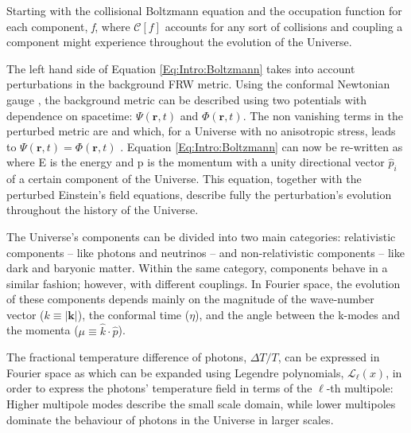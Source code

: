 \qquad Starting with the collisional Boltzmann equation and the occupation function for each component, \textit{f}, 
where $\mathcal{C}[f]$ accounts for any sort of collisions and coupling a component might experience throughout the evolution of the Universe.

\qquad The left hand side of Equation \eqref{Eq:Intro:Boltzmann} takes into account perturbations in the background FRW metric. Using the conformal Newtonian gauge \citep{dods}, the background metric can be described using two potentials with dependence on spacetime: $\Psi (\textbf{r}, t)$ and $\Phi (\textbf{r}, t)$. The non vanishing terms in the perturbed metric are
and 
which, for a Universe with no anisotropic stress, leads to $\Psi (\textbf{r},t) = \Phi(\textbf{r},t)$ \citep{Peacock}. Equation \eqref{Eq:Intro:Boltzmann} can now be re-written as
where E is the energy and p is the momentum with a unity directional vector $\hat{p}_i$ of a certain component of the Universe. This equation, together with the perturbed Einstein's field equations, describe fully the perturbation's evolution throughout the history of the Universe.

\qquad The Universe's components can be divided into two main categories: relativistic components -- like photons and neutrinos -- and non-relativistic components -- like dark and baryonic matter. Within the same category, components behave in a similar fashion; however, with different couplings. In Fourier space, the evolution of these components depends mainly on the magnitude of the wave-number vector ($k \equiv |\textbf{k}|$), the conformal time ($\eta$), and the angle between the k-modes and the momenta ($\mu\equiv \hat{k} \cdot \hat{p}$). 

\qquad The fractional temperature difference of photons, $\Delta T/T$, can be expressed in Fourier space as
which can be expanded using Legendre polynomials, $\mathcal{L}_{\ell}(x)$, in order to express the photons' temperature field in terms of the $\ell$-th multipole:
Higher multipole modes describe the small scale domain, while lower multipoles dominate the behaviour of photons in the Universe in larger scales. 

